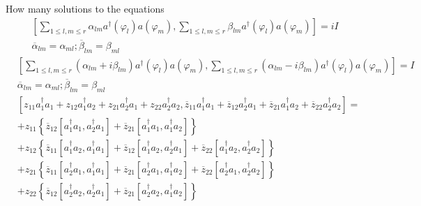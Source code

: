 \documentclass[aps,preprint]{revtex4}%
\begin{document}
How many solutions to the equations
\begin{align}
&  \left[  \sum_{1\leq l,m\leq r}\alpha_{lm}a^{\dagger}\left(  \varphi
_{l}\right)  a\left(  \varphi_{m}\right)  ,\sum_{1\leq l,m\leq r}\beta
_{lm}a^{\dagger}\left(  \varphi_{l}\right)  a\left(  \varphi_{m}\right)
\right]  =iI\\
&  \overline{\alpha}_{lm}=\alpha_{ml};\overline{\beta}_{lm}=\beta_{ml}%
\end{align}%
\begin{align}
&  \left[  \sum_{1\leq l,m\leq r}\left(  \alpha_{lm}+i\beta_{lm}\right)
a^{\dagger}\left(  \varphi_{l}\right)  a\left(  \varphi_{m}\right)
,\sum_{1\leq l,m\leq r}\left(  \alpha_{lm}-i\beta_{lm}\right)  a^{\dagger
}\left(  \varphi_{l}\right)  a\left(  \varphi_{m}\right)  \right]  =I\\
&  \overline{\alpha}_{lm}=\alpha_{ml};\overline{\beta}_{lm}=\beta_{ml}%
\end{align}%
\begin{align}
& \left[  z_{11}a_{1}^{\dagger}a_{1}+z_{12}a_{1}^{\dagger}a_{2}+z_{21}%
a_{2}^{\dagger}a_{1}+z_{22}a_{2}^{\dagger}a_{2},\overline{z}_{11}%
a_{1}^{\dagger}a_{1}+\overline{z}_{12}a_{2}^{\dagger}a_{1}+\overline{z}%
_{21}a_{1}^{\dagger}a_{2}+\overline{z}_{22}a_{2}^{\dagger}a_{2}\right]  =\\
& +z_{11}\left\{  \overline{z}_{12}\left[  a_{1}^{\dagger}a_{1},a_{2}%
^{\dagger}a_{1}\right]  +\overline{z}_{21}\left[  a_{1}^{\dagger}a_{1}%
,a_{1}^{\dagger}a_{2}\right]  \right\}  \\
& +z_{12}\left\{  \overline{z}_{11}\left[  a_{1}^{\dagger}a_{2},a_{1}%
^{\dagger}a_{1}\right]  +\overline{z}_{12}\left[  a_{1}^{\dagger}a_{2}%
,a_{2}^{\dagger}a_{1}\right]  +\overline{z}_{22}\left[  a_{1}^{\dagger}%
a_{2},a_{2}^{\dagger}a_{2}\right]  \right\}  \\
& +z_{21}\left\{  \overline{z}_{11}\left[  a_{2}^{\dagger}a_{1},a_{1}%
^{\dagger}a_{1}\right]  +\overline{z}_{21}\left[  a_{2}^{\dagger}a_{1}%
,a_{1}^{\dagger}a_{2}\right]  +\overline{z}_{22}\left[  a_{2}^{\dagger}%
a_{1},a_{2}^{\dagger}a_{2}\right]  \right\}  \\
& +z_{22}\left\{  \overline{z}_{12}\left[  a_{2}^{\dagger}a_{2},a_{2}%
^{\dagger}a_{1}\right]  +\overline{z}_{21}\left[  a_{2}^{\dagger}a_{2}%
,a_{1}^{\dagger}a_{2}\right]  \right\}
\end{align}%
\end{document}
